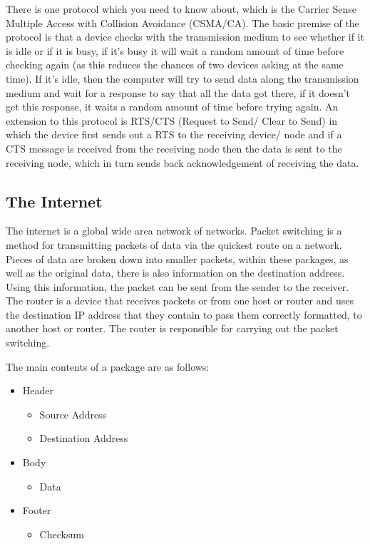   There is one protocol which you need to know about, which is the Carrier Sense Multiple Access with Collision Avoidance (CSMA/CA). The basic premise of the protocol is that a device checks with the transmission medium to see whether if it is idle or if it is busy, if it's busy it will wait a random amount of time before checking again (as this reduces the chances of two devices asking at the same time). If it's idle, then the computer will try to send data along the transmission medium and wait for a response to say that all the data got there, if it doesn't get this response, it waits a random amount of time before trying again. An extension to this protocol is RTS/CTS (Request to Send/ Clear to Send) in which the device first sends out a RTS to the receiving device/ node and if a CTS message is received from the receiving node then the data is sent to the receiving node, which in turn sends back acknowledgement of receiving the data.

\subsection{The Internet}
  \noindent
  The internet is a global wide area network of networks. Packet switching is a method for transmitting packets of data via the quickest route on a network. Pieces of data are broken down into smaller packets, within these packages, as well as the original data, there is also information on the destination address. Using this information, the packet can be sent from the sender to the receiver. The router is a device that receives packets or from one host or router and uses the destination IP address that they contain to pass them correctly formatted, to another host or router. The router is responsible for carrying out the packet switching.
  
  The main contents of a package are as follows:
  \begin{itemize}
  	\item Header
	  	\begin{itemize}
	  		\item Source Address
	  		\item Destination Address
	  	\end{itemize}
  	\item Body
	  	\begin{itemize}
	  		\item Data
	  	\end{itemize}
  	\item Footer
	  	\begin{itemize}
	  		\item Checksum
	  	\end{itemize}
  \end{itemize}
  
